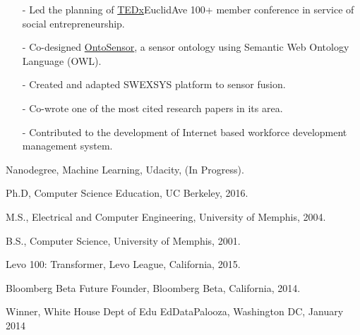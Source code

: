 \documentclass[11pt,article,oneside]{memoir}
\begin{document}
\begin{itemize}[noitemsep,nolistsep]
\item[-]Led the planning of \href{http://www.ted.com/tedx/events/3790}{TEDx}EuclidAve 100+ member conference in service of social entrepreneurship.
\end{itemize} 

\begin{itemize}[noitemsep,nolistsep]
\item[-]Co-designed \href{https://scholar.google.com/scholar?hl=en&q=Building+a+Sensor+Ontology\%3A+A+Practical+Approach+Leveraging+ISO+and+OGC+Models.&btnG=&as_sdt=1\%2C43&as_sdtp=}{OntoSensor}, a sensor ontology using Semantic Web Ontology Language (OWL).
\item[-]Created and adapted SWEXSYS platform to sensor fusion.
\item[-]Co-wrote one of the most cited research papers in its area.  
\end{itemize}

\begin{itemize}[noitemsep,nolistsep]
\item[-]Contributed to the development of Internet based workforce development management system.
\end{itemize} 

\bigskip 



\ind Nanodegree, Machine Learning, Udacity, (In Progress).

\ind Ph.D, Computer Science Education, UC Berkeley, 2016.

\ind M.S., Electrical and Computer Engineering, University of Memphis, 2004. 

\ind B.S., Computer Science, University of Memphis, 2001.
\bigskip 

\medskip

\ind Levo 100: Transformer, Levo League, California, 2015.

\ind Bloomberg Beta Future Founder, Bloomberg Beta, California, 2014. 

\ind Winner, White House Dept of Edu EdDataPalooza, Washington DC, January 2014
\end{document}
